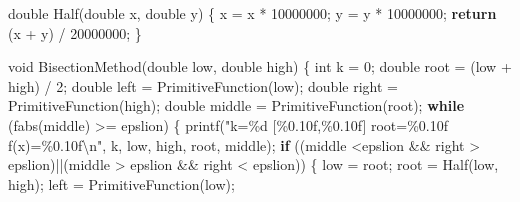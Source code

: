 \documentclass[
]{article}
\newenvironment{Shaded}{}{}
\newcommand{\ControlFlowTok}[1]{\textcolor[rgb]{0.00,0.44,0.13}{\textbf{#1}}}
\newcommand{\DataTypeTok}[1]{\textcolor[rgb]{0.56,0.13,0.00}{#1}}
\newcommand{\DecValTok}[1]{\textcolor[rgb]{0.25,0.63,0.44}{#1}}
\newcommand{\NormalTok}[1]{#1}
\newcommand{\OperatorTok}[1]{\textcolor[rgb]{0.40,0.40,0.40}{#1}}
\newcommand{\SpecialCharTok}[1]{\textcolor[rgb]{0.25,0.44,0.63}{#1}}
\newcommand{\StringTok}[1]{\textcolor[rgb]{0.25,0.44,0.63}{#1}}
\begin{document}
\begin{Shaded}
\begin{Highlighting}[]
\DataTypeTok{double}\NormalTok{ Half}\OperatorTok{(}\DataTypeTok{double}\NormalTok{ x}\OperatorTok{,} \DataTypeTok{double}\NormalTok{ y}\OperatorTok{)}
\OperatorTok{\{}
\NormalTok{	x }\OperatorTok{=}\NormalTok{ x }\OperatorTok{*} \DecValTok{10000000}\OperatorTok{;}
\NormalTok{	y }\OperatorTok{=}\NormalTok{ y }\OperatorTok{*} \DecValTok{10000000}\OperatorTok{;}
	\ControlFlowTok{return} \OperatorTok{(}\NormalTok{x }\OperatorTok{+}\NormalTok{ y}\OperatorTok{)} \OperatorTok{/} \DecValTok{20000000}\OperatorTok{;}
\OperatorTok{\}}

\DataTypeTok{void}\NormalTok{ BisectionMethod}\OperatorTok{(}\DataTypeTok{double}\NormalTok{ low}\OperatorTok{,} \DataTypeTok{double}\NormalTok{ high}\OperatorTok{)}
\OperatorTok{\{}
	\DataTypeTok{int}\NormalTok{ k }\OperatorTok{=} \DecValTok{0}\OperatorTok{;}
	\DataTypeTok{double}\NormalTok{ root }\OperatorTok{=} \OperatorTok{(}\NormalTok{low }\OperatorTok{+}\NormalTok{ high}\OperatorTok{)} \OperatorTok{/} \DecValTok{2}\OperatorTok{;}
	\DataTypeTok{double}\NormalTok{ left }\OperatorTok{=}\NormalTok{ PrimitiveFunction}\OperatorTok{(}\NormalTok{low}\OperatorTok{);}
	\DataTypeTok{double}\NormalTok{ right }\OperatorTok{=}\NormalTok{ PrimitiveFunction}\OperatorTok{(}\NormalTok{high}\OperatorTok{);}
	\DataTypeTok{double}\NormalTok{ middle }\OperatorTok{=}\NormalTok{ PrimitiveFunction}\OperatorTok{(}\NormalTok{root}\OperatorTok{);}
	\ControlFlowTok{while} \OperatorTok{(}\NormalTok{fabs}\OperatorTok{(}\NormalTok{middle}\OperatorTok{)} \OperatorTok{\textgreater{}=}\NormalTok{ epslion}\OperatorTok{)}
	\OperatorTok{\{}
\NormalTok{		printf}\OperatorTok{(}\StringTok{"k=\%d	[\%0.10f,\%0.10f]		root=\%0.10f		f(x)=\%0.10f}\SpecialCharTok{\textbackslash{}n}\StringTok{"}\OperatorTok{,}\NormalTok{ k}\OperatorTok{,}\NormalTok{ low}\OperatorTok{,}\NormalTok{ high}\OperatorTok{,}\NormalTok{ root}\OperatorTok{,}\NormalTok{ middle}\OperatorTok{);}
		\ControlFlowTok{if} \OperatorTok{((}\NormalTok{middle }\OperatorTok{\textless{}}\NormalTok{epslion }\OperatorTok{\&\&}\NormalTok{ right }\OperatorTok{\textgreater{}}\NormalTok{ epslion}\OperatorTok{)||(}\NormalTok{middle }\OperatorTok{\textgreater{}}\NormalTok{ epslion }\OperatorTok{\&\&}\NormalTok{ right }\OperatorTok{\textless{}}\NormalTok{ epslion}\OperatorTok{))}
		\OperatorTok{\{}
\NormalTok{			low }\OperatorTok{=}\NormalTok{ root}\OperatorTok{;}
\NormalTok{			root }\OperatorTok{=}\NormalTok{ Half}\OperatorTok{(}\NormalTok{low}\OperatorTok{,}\NormalTok{ high}\OperatorTok{);}
\NormalTok{			left }\OperatorTok{=}\NormalTok{ PrimitiveFunction}\OperatorTok{(}\NormalTok{low}\OperatorTok{);}

\end{Highlighting}
\end{Shaded}
\end{document}
